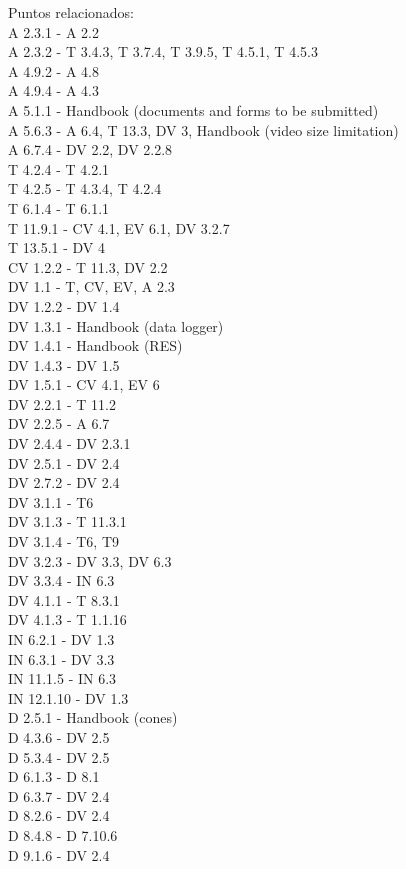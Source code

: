 \documentclass{article}
\begin{document}
Puntos relacionados:\\
A 2.3.1 - A 2.2\\
A 2.3.2 - T 3.4.3, T 3.7.4, T 3.9.5, T 4.5.1, T 4.5.3\\
A 4.9.2 - A 4.8\\
A 4.9.4 - A 4.3\\
A 5.1.1 - Handbook (documents and forms to be submitted)\\
A 5.6.3 - A 6.4, T 13.3, DV 3, Handbook (video size limitation)\\
A 6.7.4 - DV 2.2, DV 2.2.8\\
T 4.2.4 - T 4.2.1\\
T 4.2.5 - T 4.3.4, T 4.2.4\\
T 6.1.4 - T 6.1.1\\
T 11.9.1 - CV 4.1, EV 6.1, DV 3.2.7\\
T 13.5.1 - DV 4\\
CV 1.2.2 - T 11.3, DV 2.2\\
DV 1.1 - T, CV, EV, A 2.3\\
DV 1.2.2 - DV 1.4\\
DV 1.3.1 - Handbook (data logger)\\
DV 1.4.1 - Handbook (RES)\\
DV 1.4.3 - DV 1.5\\
DV 1.5.1 - CV 4.1, EV 6\\
DV 2.2.1 - T 11.2\\
DV 2.2.5 - A 6.7\\
DV 2.4.4 - DV 2.3.1\\
DV 2.5.1 - DV 2.4\\
DV 2.7.2 - DV 2.4\\
DV 3.1.1 - T6\\
DV 3.1.3 - T 11.3.1\\
DV 3.1.4 - T6, T9\\
DV 3.2.3 - DV 3.3, DV 6.3\\
DV 3.3.4 - IN 6.3\\
DV 4.1.1 - T 8.3.1\\
DV 4.1.3 - T 1.1.16\\
IN 6.2.1 - DV 1.3\\
IN 6.3.1 - DV 3.3\\
IN 11.1.5 - IN 6.3\\
IN 12.1.10 - DV 1.3\\
D 2.5.1 - Handbook (cones)\\
D 4.3.6 - DV 2.5\\
D 5.3.4 - DV 2.5\\
D 6.1.3 - D 8.1\\
D 6.3.7 - DV 2.4\\
D 8.2.6 - DV 2.4\\
D 8.4.8 - D 7.10.6\\
D 9.1.6 - DV 2.4\\
\end{document}
